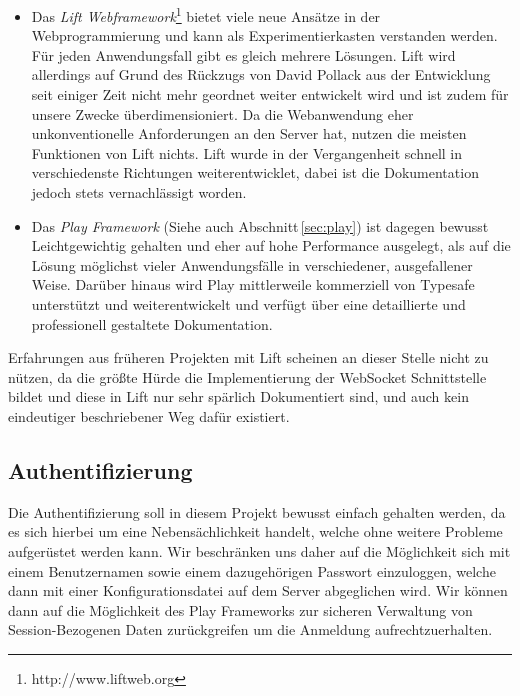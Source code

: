 \begin{itemize}

  \item Das \textit{Lift Webframework}\footnote{http://www.liftweb.org} bietet viele neue Ansätze in
der Webprogrammierung und kann als Experimentierkasten verstanden werden. Für jeden Anwendungsfall
gibt es gleich mehrere Lösungen. Lift wird allerdings auf Grund des Rückzugs von David Pollack aus
der Entwicklung seit einiger Zeit nicht mehr geordnet weiter entwickelt wird und ist zudem für
unsere Zwecke überdimensioniert. Da die Webanwendung eher unkonventionelle Anforderungen an den
Server hat, nutzen die meisten Funktionen von Lift nichts. Lift wurde in der Vergangenheit schnell
in verschiedenste Richtungen weiterentwicklet, dabei ist die Dokumentation jedoch stets
vernachlässigt worden.


  \item Das \textit{Play Framework} (Siehe auch Abschnitt\,\ref{sec:play}) ist dagegen bewusst
Leichtgewichtig gehalten und eher auf hohe Performance ausgelegt, als auf die Lösung möglichst
vieler Anwendungsfälle in verschiedener, ausgefallener Weise. Darüber hinaus wird Play mittlerweile
kommerziell von Typesafe unterstützt und weiterentwickelt und verfügt über eine detaillierte und
professionell gestaltete Dokumentation. \cite{play}

\end{itemize}

Erfahrungen aus früheren Projekten mit Lift scheinen an dieser Stelle nicht zu nützen, da die größte
Hürde die Implementierung der WebSocket Schnittstelle bildet und diese in Lift nur sehr spärlich
Dokumentiert sind, und auch kein eindeutiger beschriebener Weg dafür existiert.

\subsection{Authentifizierung}

Die Authentifizierung soll in diesem Projekt bewusst einfach gehalten werden, da es sich hierbei um
eine Nebensächlichkeit handelt, welche ohne weitere Probleme aufgerüstet werden kann. Wir
beschränken uns daher auf die Möglichkeit sich mit einem Benutzernamen sowie einem dazugehörigen
Passwort einzuloggen, welche dann mit einer Konfigurationsdatei auf dem Server abgeglichen wird. Wir
können dann auf die Möglichkeit des Play Frameworks zur sicheren Verwaltung von Session-Bezogenen
Daten zurückgreifen um die Anmeldung aufrechtzuerhalten.


